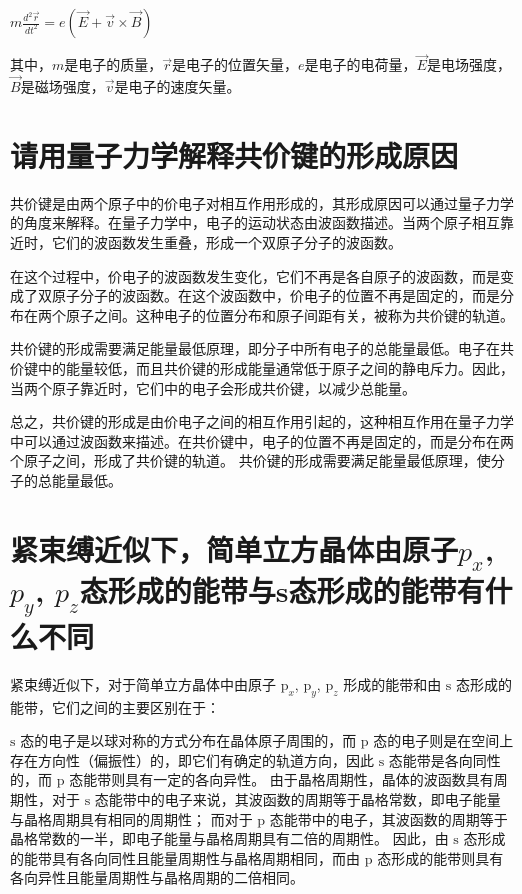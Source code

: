 \documentclass[12pt, a4paper, oneside]{ctexart}
\begin{document}
\begin{spacing}{2.0}
$m\frac{d^2\vec{r}}{dt^2}=e(\vec{E}+\vec{v}\times \vec{B})$

其中，$m$是电子的质量，$\vec{r}$是电子的位置矢量，$e$是电子的电荷量，$\vec{E}$是电场强度，$\vec{B}$是磁场强度，$\vec{v}$是电子的速度矢量。

\section{请用量子力学解释共价键的形成原因}
共价键是由两个原子中的价电子对相互作用形成的，其形成原因可以通过量子力学的角度来解释。在量子力学中，电子的运动状态由波函数描述。当两个原子相互靠近时，它们的波函数发生重叠，形成一个双原子分子的波函数。

在这个过程中，价电子的波函数发生变化，它们不再是各自原子的波函数，而是变成了双原子分子的波函数。在这个波函数中，价电子的位置不再是固定的，而是分布在两个原子之间。这种电子的位置分布和原子间距有关，被称为共价键的轨道。

共价键的形成需要满足能量最低原理，即分子中所有电子的总能量最低。电子在共价键中的能量较低，而且共价键的形成能量通常低于原子之间的静电斥力。因此，当两个原子靠近时，它们中的电子会形成共价键，以减少总能量。

总之，共价键的形成是由价电子之间的相互作用引起的，这种相互作用在量子力学中可以通过波函数来描述。在共价键中，电子的位置不再是固定的，而是分布在两个原子之间，形成了共价键的轨道。
共价键的形成需要满足能量最低原理，使分子的总能量最低。
\section{紧束缚近似下，简单立方晶体由原子$p_x$, $p_y$, $p_z$态形成的能带与s态形成的能带有什么不同}
紧束缚近似下，对于简单立方晶体中由原子 $\mathrm{p}_x$, $\mathrm{p}_y$, $\mathrm{p}_z$ 形成的能带和由 $\mathrm{s}$ 态形成的能带，它们之间的主要区别在于：

$\mathrm{s}$ 态的电子是以球对称的方式分布在晶体原子周围的，而 $\mathrm{p}$ 态的电子则是在空间上存在方向性（偏振性）的，即它们有确定的轨道方向，因此 $\mathrm{s}$ 态能带是各向同性的，而 $\mathrm{p}$ 态能带则具有一定的各向异性。
由于晶格周期性，晶体的波函数具有周期性，对于 $\mathrm{s}$ 态能带中的电子来说，其波函数的周期等于晶格常数，即电子能量与晶格周期具有相同的周期性；
而对于 $\mathrm{p}$ 态能带中的电子，其波函数的周期等于晶格常数的一半，即电子能量与晶格周期具有二倍的周期性。
因此，由 $\mathrm{s}$ 态形成的能带具有各向同性且能量周期性与晶格周期相同，而由 $\mathrm{p}$ 态形成的能带则具有各向异性且能量周期性与晶格周期的二倍相同。

\end{spacing}
\end{document}
